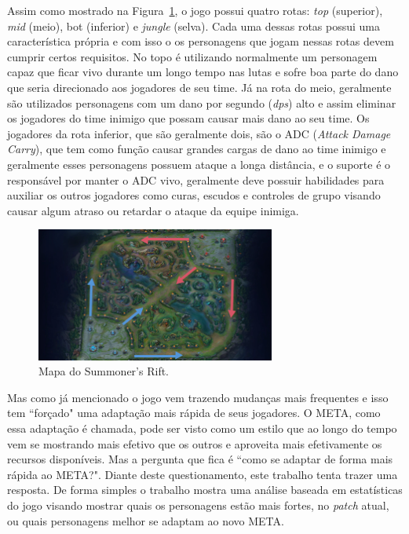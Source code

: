 \documentclass[a4paper]{article}
\begin{document}
Assim como mostrado na Figura~\ref{fig:map}, o jogo possui quatro rotas: \textit{top} (superior), \textit{mid} (meio), bot (inferior) e \textit{jungle} (selva). Cada uma dessas rotas possui uma característica própria e com isso o os personagens que jogam nessas rotas devem cumprir certos requisitos.  No topo é utilizando normalmente um personagem capaz que ficar vivo durante um longo tempo nas lutas e sofre boa parte do dano que seria direcionado aos jogadores de seu time. Já na rota do meio, geralmente são utilizados personagens com um dano por segundo (\textit{dps}) alto e assim eliminar os jogadores do time inimigo que possam causar mais dano ao seu time. Os jogadores da rota inferior, que são geralmente dois, são o ADC (\textit{Attack Damage Carry}), que tem como função causar grandes cargas de dano ao time inimigo e geralmente esses personagens possuem ataque a longa distância, e o suporte é o responsável por manter o ADC vivo, geralmente deve possuir habilidades para auxiliar os outros jogadores como curas, escudos e controles de grupo visando causar algum atraso ou retardar o ataque da equipe inimiga. 

\begin{figure}[ht]
\centering
\includegraphics[width=0.7\textwidth]{imagens/rotas}
\caption{\label{fig:map}Mapa do Summoner's Rift. \cite{leol}}
\end{figure}

Mas como já mencionado o jogo vem trazendo mudanças mais frequentes e isso tem ``forçado" uma adaptação mais rápida de seus jogadores. O META, como essa adaptação é chamada, pode ser visto como um estilo que ao longo do tempo vem se mostrando mais efetivo que os outros e aproveita mais efetivamente os recursos disponíveis. Mas a pergunta que fica é ``como se adaptar de forma mais rápida ao META?".  Diante deste questionamento, este trabalho tenta trazer uma resposta. De forma simples o trabalho mostra uma análise baseada em estatísticas do jogo visando mostrar quais os personagens estão mais fortes, no \textit{patch} atual, ou quais personagens melhor se adaptam ao novo META.  
\end{document}
